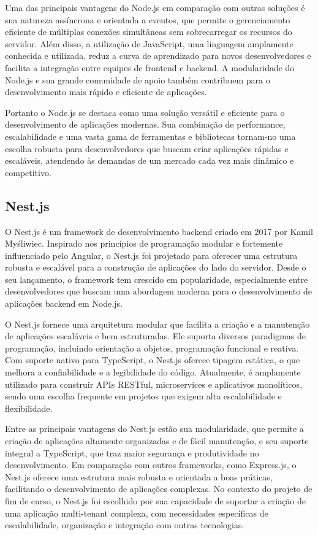 Uma das principais vantagens do Node.js em comparação com outras soluções é sua natureza assíncrona e orientada a eventos, que permite o gerenciamento eficiente de múltiplas conexões simultâneas sem sobrecarregar os recursos do servidor. Além disso, a utilização de JavaScript, uma linguagem amplamente conhecida e utilizada, reduz a curva de aprendizado para novos desenvolvedores e facilita a integração entre equipes de frontend e backend. A modularidade do Node.js e sua grande comunidade de apoio também contribuem para o desenvolvimento mais rápido e eficiente de aplicações.

Portanto o Node.js se destaca como uma solução versátil e eficiente para o desenvolvimento de aplicações modernas. Sua combinação de performance, escalabilidade e uma vasta gama de ferramentas e bibliotecas tornam-no uma escolha robusta para desenvolvedores que buscam criar aplicações rápidas e escaláveis, atendendo às demandas de um mercado cada vez mais dinâmico e competitivo.

\subsection{Nest.js}

O Nest.js é um framework de desenvolvimento backend criado em 2017 por Kamil Myśliwiec. Inspirado nos princípios de programação modular e fortemente influenciado pelo Angular, o Nest.js foi projetado para oferecer uma estrutura robusta e escalável para a construção de aplicações do lado do servidor. Desde o seu lançamento, o framework tem crescido em popularidade, especialmente entre desenvolvedores que buscam uma abordagem moderna para o desenvolvimento de aplicações backend em Node.js.

O Nest.js fornece uma arquitetura modular que facilita a criação e a manutenção de aplicações escaláveis e bem estruturadas. Ele suporta diversos paradigmas de programação, incluindo orientação a objetos, programação funcional e reativa. Com suporte nativo para TypeScript, o Nest.js oferece tipagem estática, o que melhora a confiabilidade e a legibilidade do código. Atualmente, é amplamente utilizado para construir APIs RESTful, microservices e aplicativos monolíticos, sendo uma escolha frequente em projetos que exigem alta escalabilidade e flexibilidade.

Entre as principais vantagens do Nest.js estão sua modularidade, que permite a criação de aplicações altamente organizadas e de fácil manutenção, e seu suporte integral a TypeScript, que traz maior segurança e produtividade no desenvolvimento. Em comparação com outros frameworks, como Express.js, o Nest.js oferece uma estrutura mais robusta e orientada a boas práticas, facilitando o desenvolvimento de aplicações complexas. No contexto do projeto de fim de curso, o Nest.js foi escolhido por sua capacidade de suportar a criação de uma aplicação multi-tenant complexa, com necessidades específicas de escalabilidade, organização e integração com outras tecnologias.

